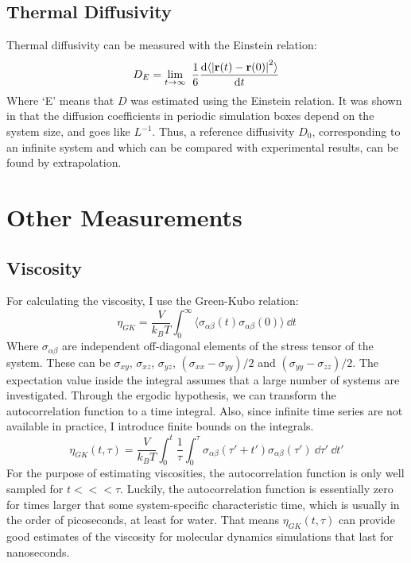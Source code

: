 \subsection{Thermal Diffusivity}
Thermal diffusivity can be measured with the Einstein relation:
\begin{equation}
	D_E = \lim_{t\to\infty} \frac{1}{6} \frac{\dd \langle \left|\rvec(t) - \rvec(0)\right|^2\rangle}{\dd t}
	\label{eq:Einstein_diffusivity}
\end{equation}
Where `E' means that $D$ was estimated using the Einstein relation. It was shown in \cite{Yeh2004} that the diffusion coefficients in periodic simulation boxes depend on the system size, and goes like $L^{-1}$. Thus, a reference diffusivity $D_0$, corresponding to an infinite system and which can be compared with experimental results, can be found by extrapolation.


\section{Other Measurements}
\subsection{Viscosity}
For calculating the viscosity, I use the Green-Kubo relation:
\begin{equation}
	\eta_{GK} = \frac{V}{k_B T} \int_0^\infty \langle \sigma_{\alpha\beta}(t) \sigma_{\alpha\beta}(0) \rangle\ \dd t
	\label{eq:GK_shear_viscosity}
\end{equation}
Where $\sigma_{\alpha\beta}$ are independent off-diagonal elements of the stress tensor of the system. These can be $\sigma_{xy}$, $\sigma_{xz}$, $\sigma_{yz}$, $(\sigma_{xx}-\sigma_{yy})/2$ and $(\sigma_{yy}-\sigma_{zz})/2$. The expectation value inside the integral assumes that a large number of systems are investigated. Through the ergodic hypothesis, we can transform the autocorrelation function to a time integral. Also, since infinite time series are not available in practice, I introduce finite bounds on the integrals. 
\begin{equation}
	\eta_{GK}(t, \tau) = \frac{V}{k_B T} \int_0^t  \frac{1}{\tau} \int_0^\tau \sigma_{\alpha\beta}(\tau'+t') \sigma_{\alpha\beta}(\tau')\ \dd \tau'\ \dd t' 
\label{eq:GK_shear_viscosity_estimate}
\end{equation}
For the purpose of estimating viscosities, the autocorrelation function is only well sampled for $t <<< \tau$. Luckily, the autocorrelation function is essentially zero for times larger that some system-specific characteristic time, which is usually in the order of picoseconds, at least for water. That means $\eta_{GK}(t, \tau)$ can provide good estimates of the viscosity for molecular dynamics simulations that last for nanoseconds.


